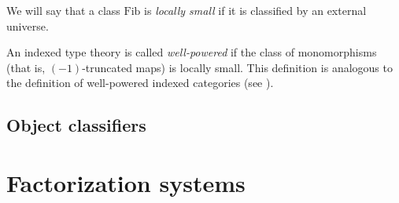 \documentclass[reqno]{amsart}
\theoremstyle{definition}
\theoremstyle{remark}
\newcommand{\fs}[1]{\mathrm{#1}}
\newcommand{\Fib}{\fs{Fib}}
\numberwithin{figure}{section}
\begin{document}
\begin{defn}
We will say that a class $\Fib$ is \emph{locally small} if it is classified by an external universe.
\end{defn}

\begin{example}
An indexed type theory is called \emph{well-powered} if the class of monomorphisms (that is, $(-1)$-truncated maps) is locally small.
This definition is analogous to the definition of well-powered indexed categories (see \cite[Example~B1.3.14]{elephant}).
\end{example}

\subsection{Object classifiers}

\section{Factorization systems}




\end{document}
